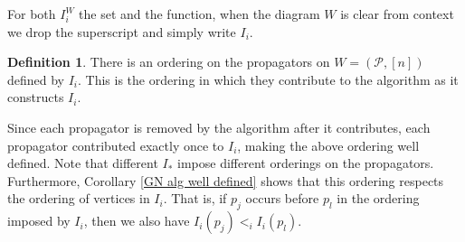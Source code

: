 \documentclass[11pt]{article}
\newcommand{\note}{\todo[color=green!40]}
\newcommand{\cP}{\mathcal{P}}
\theoremstyle{remark}
\theoremstyle{definition}
\newtheorem{dfn}[thm]{Definition}
\begin{document}
For both $I_i^W$ the set and the function, when the diagram $W$ is clear from context we drop the superscript and simply write $I_i$.

  
\begin{dfn} \label{proporderingdfn}
  There is an ordering on the propagators on $W = (\cP, [n])$ defined by $I_i$. This is the ordering in which they contribute to the algorithm as it constructs $I_i$.
\end{dfn}

Since each propagator is removed by the algorithm after it contributes, each propagator contributed exactly once to $I_i$, making the above ordering well defined.
Note that different $I_*$ impose different orderings on the propagators. Furthermore, Corollary \ref{GN alg well defined} shows that this ordering respects the ordering of vertices in $I_i$. That is, if $p_j$ occurs before $p_l$ in the ordering imposed by $I_i$, then we also have $I_i(p_j) <_i I_i(p_l)$.
\end{document}
